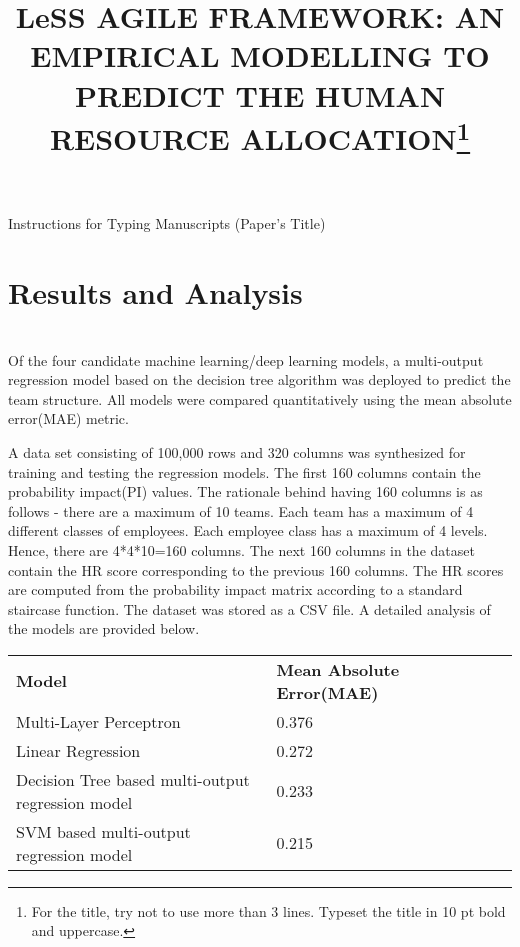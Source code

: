 \documentclass{ws-ijseke}
\begin{document}
{Instructions for Typing Manuscripts (Paper's Title)}

%
\catchline{}{}{}{}{}
%

\title{LeSS AGILE FRAMEWORK:  AN EMPIRICAL MODELLING TO PREDICT THE HUMAN RESOURCE ALLOCATION\footnote{For the title, try not to 
use more than 3 lines. Typeset the title in 10 pt bold and uppercase.}}

\section{Results and Analysis  \label{sec3}} \\
Of the four candidate machine learning/deep learning models,  a multi-output regression model based on the decision tree algorithm was deployed to predict the team structure.  All models were compared quantitatively using the mean absolute error(MAE) metric.

A data set consisting of 100,000 rows and 320 columns was synthesized for training and testing the regression models. The first 160 columns contain the probability impact(PI) values. The rationale behind having 160 columns is as follows - there are a maximum of 10 teams. Each team has a maximum of 4 different classes of employees. Each employee class has a maximum of 4 levels. Hence, there are 4*4*10=160 columns. The next 160 columns in the dataset contain the HR score corresponding to the previous 160 columns. The HR scores are computed from the probability impact matrix according to a standard staircase function. The dataset was stored as a CSV file. A detailed analysis of the models are provided below.
\begin{table}[h]
\begin{tabular}{|l|l|lll}
\cline{1-2}
\textbf{Model}                                    & \textbf{Mean Absolute Error(MAE)} &  &  &  \\ \cline{1-2}
Multi-Layer Perceptron                            & 0.376                             &  &  &  \\ \cline{1-2}
Linear Regression                                 & 0.272                             &  &  &  \\ \cline{1-2}
Decision Tree based multi-output regression model & 0.233                             &  &  &  \\ \cline{1-2}
SVM based multi-output regression model           & 0.215                             &  &  &  \\ \cline{1-2}
\end{tabular}
\end{table}
\end{document}
